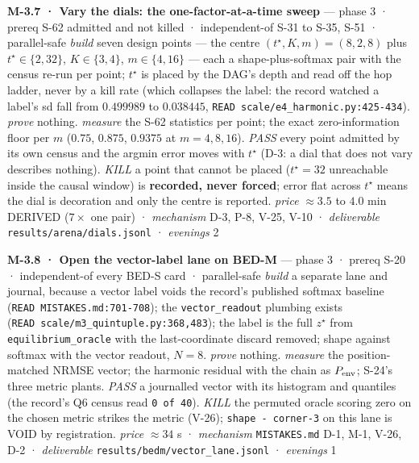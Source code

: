 \documentclass[11pt,a4paper]{article}
\theoremstyle{plain}
\theoremstyle{definition}
\theoremstyle{remark}
\begin{document}
\textbf{M-3.7 · Vary the dials: the one-factor-at-a-time sweep} ---
phase 3 · prereq S-62 admitted and not killed · independent-of S-31 to
S-35, S-51 · parallel-safe \emph{build} seven design points --- the
centre \((t^\star,K,m)=(8,2,8)\) plus \(t^\star\in\{2,32\}\),
\(K\in\{3,4\}\), \(m\in\{4,16\}\) --- each a shape-plus-softmax pair
with the census re-run per point; \(t^\star\) is placed by the DAG's
depth and read off the hop ladder, never by a kill rate (which collapses
the label: the record watched a label's sd fall from \(0.499989\) to
\(0.038445\), \texttt{READ\ scale/e4\_harmonic.py:425-434}).
\emph{prove} nothing. \emph{measure} the S-62 statistics per point; the
exact zero-information floor per \(m\) (\(0.75\), \(0.875\), \(0.9375\)
at \(m=4,8,16\)). \emph{PASS} every point admitted by its own census and
the argmin error moves with \(t^\star\) (D-3: a dial that does not vary
describes nothing). \emph{KILL} a point that cannot be placed
(\(t^\star=32\) unreachable inside the causal window) is
\textbf{recorded, never forced}; error flat across \(t^\star\) means the
dial is decoration and only the centre is reported. \emph{price}
\(\approx3.5\) to \(4.0\) min DERIVED (\(7\times\) one pair) ·
\emph{mechanism} D-3, P-8, V-25, V-10 · \emph{deliverable}
\texttt{results/arena/dials.jsonl} · \emph{evenings} 2

\textbf{M-3.8 · Open the vector-label lane on BED-M} --- phase 3 ·
prereq S-20 · independent-of every BED-S card · parallel-safe
\emph{build} a separate lane and journal, because a vector label voids
the record's published softmax baseline
(\texttt{READ\ MISTAKES.md:701-708}); the \texttt{vector\_readout}
plumbing exists (\texttt{READ\ scale/m3\_quintuple.py:368,483}); the
label is the full \(z^\star\) from \texttt{equilibrium\_oracle} with the
last-coordinate discard removed; shape against softmax with the vector
readout, \(N=8\). \emph{prove} nothing. \emph{measure} the
position-matched NRMSE vector; the harmonic residual with the chain as
\(P_{\rm env}\); S-24's three metric plants. \emph{PASS} a journalled
vector with its histogram and quantiles (the record's Q6 census read
\texttt{0\ of\ 40}). \emph{KILL} the permuted oracle scoring zero on the
chosen metric strikes the metric (V-26); \texttt{shape\ -\ corner-3} on
this lane is VOID by registration. \emph{price} \(\approx34\) s ·
\emph{mechanism} \texttt{MISTAKES.md} D-1, M-1, V-26, D-2 ·
\emph{deliverable} \texttt{results/bedm/vector\_lane.jsonl} ·
\emph{evenings} 1
\end{document}
